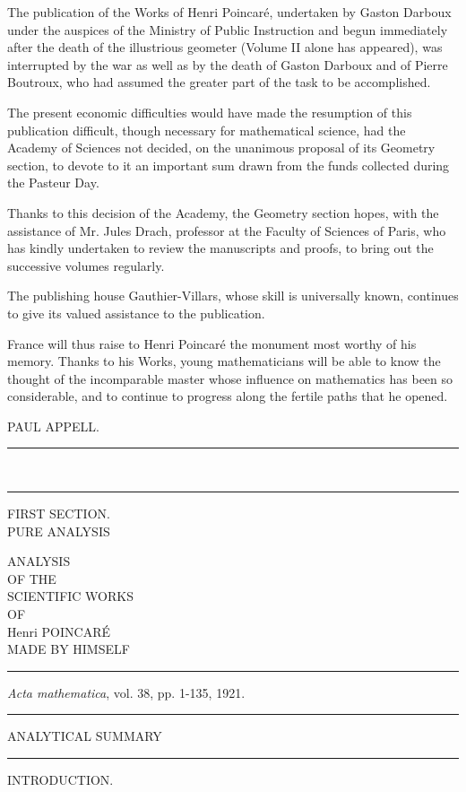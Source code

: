 \documentclass[11pt]{article}
\newcommand{\ornament}{\begin{center}\rule{2.5em}{0.4pt}\,\raisebox{0.1ex}{\tiny$\bullet\bullet\bullet$}\,\rule{2.5em}{0.4pt}\end{center}}
\newcommand{\shortline}{\begin{center}\rule{3.5em}{0.4pt}\end{center}}
\begin{document}
The publication of the Works of Henri Poincaré, undertaken by Gaston Darboux under the auspices of the Ministry of Public Instruction and begun immediately after the death of the illustrious geometer (Volume II alone has appeared), was interrupted by the war as well as by the death of Gaston Darboux and of Pierre Boutroux, who had assumed the greater part of the task to be accomplished.

The present economic difficulties would have made the resumption of this publication difficult, though necessary for mathematical science, had the Academy of Sciences not decided, on the unanimous proposal of its Geometry section, to devote to it an important sum drawn from the funds collected during the Pasteur Day.

Thanks to this decision of the Academy, the Geometry section hopes, with the assistance of Mr. Jules Drach, professor at the Faculty of Sciences of Paris, who has kindly undertaken to review the manuscripts and proofs, to bring out the successive volumes regularly.

The publishing house Gauthier-Villars, whose skill is universally known, continues to give its valued assistance to the publication.

France will thus raise to Henri Poincaré the monument most worthy of his memory. Thanks to his Works, young mathematicians will be able to know the thought of the incomparable master whose influence on mathematics has been so considerable, and to continue to progress along the fertile paths that he opened.

\begin{flushright}
PAUL APPELL.
\end{flushright}
\ornament
\clearpage

\begin{center}
{\small FIRST SECTION.}\\[1.4em]
{\Large PURE ANALYSIS}
\end{center}
\clearpage

\begin{center}
{\Large ANALYSIS}\\[0.6em]
{\small OF THE}\\[0.6em]
{\huge SCIENTIFIC WORKS}\\[0.7em]
{\small OF}\\[0.5em]
{\large Henri POINCARÉ}\\[0.5em]
{\small MADE BY HIMSELF}\\[0.8em]
\shortline
\emph{Acta mathematica}, vol. 38, pp. 1-135, 1921.\\
\shortline
{\Large ANALYTICAL SUMMARY}\\[0.8em]
\shortline
{\large INTRODUCTION.}
\end{center}
\end{document}
